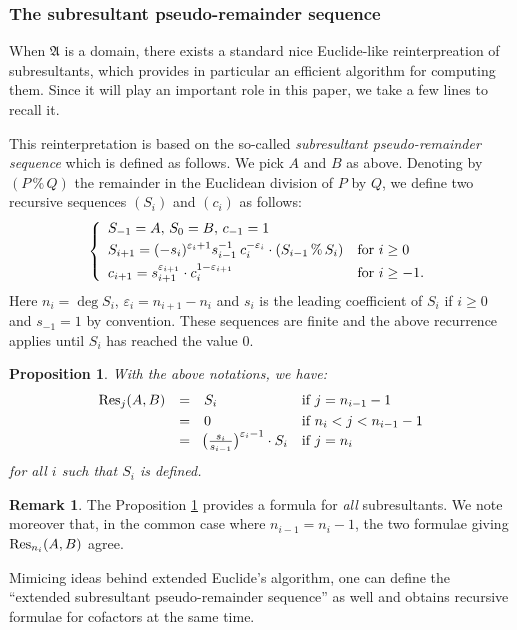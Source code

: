 \documentclass{jT}
\numberwithin{equation}{section}
\newtheorem{prop}[theo]{Proposition}
\theoremstyle{definition}
\newtheorem{rem}[theo]{Remark}
\newcommand{\ring}{\mathfrak A}
\renewcommand{\Res}{\text{\rm Res}}
\begin{document}
\subsubsection*{The subresultant pseudo-remainder sequence}

When $\ring$ is a domain, there exists a standard nice Euclide-like
reinterpreation of subresultants, which provides in particular an 
efficient algorithm for computing them. Since it will play an important 
role in this paper, we take a few lines to recall it.

This reinterpretation is based on the so-called \emph{subresultant 
pseudo-re\-mainder sequence} which is defined as follows. We pick $A$ and 
$B$ as above. Denoting by $(P \,\%\, Q)$ 
the remainder in the Euclidean division of $P$ by $Q$, we define two 
recursive sequences $(S_i)$ and $(c_i)$ as follows:
\begin{equation}
\label{eq:subressequence}
\left\{\begin{array}{ll}
S_{-1} = A, \, S_0 = B, \, c_{-1} = 1 \smallskip \\
\displaystyle S_{i+1} = (-s_i)^{\varepsilon_i + 1}
s_{i-1}^{-1} \: c_i^{-\varepsilon_i} \cdot (S_{i-1} \,\%\, S_i)
& \text{for } i \geq 0 \smallskip \\
\displaystyle c_{i+1} = s_{i+1}^{\varepsilon_{i+1}} \cdot c_i^{1-\varepsilon_{i+1}}
& \text{for } i \geq -1. 
\end{array}\right.
\end{equation}
Here $n_i = \deg S_i$, $\varepsilon_i = n_{i+1} - n_i$ and $s_i$ is the 
leading coefficient of $S_i$ if $i \geq 0$ and $s_{-1} = 1$ by 
convention. These sequences are finite and the above recurrence applies 
until $S_i$ has reached the value $0$.

\begin{prop}
\label{prop:prem}
With the above notations, we have:
$$\begin{array}{rcll}
\Res_j(A,B) & = & S_i & \text{if } j = n_{i-1} - 1 \smallskip \\
& = & 0 & \text{if } n_i < j < n_{i-1} - 1 \\
& = & \!\big(\frac{s_i}{s_{i-1}}\big)^{\varepsilon_i-1} \cdot S_i & 
\text{if } j = n_i
\end{array}$$
for all $i$ such that $S_i$ is defined.
\end{prop}

\begin{rem}
The Proposition \ref{prop:prem} provides a formula for \emph{all} 
subresultants. We note moreover that, in the common case where $n_{i-1} 
= n_i - 1$, the two formulae giving $\Res_{n_i}(A,B)$ agree.

Mimicing ideas behind extended Euclide's algorithm, one can define the 
``extended subresultant pseudo-remainder sequence'' as well and obtains
recursive formulae for cofactors at the same time.
\end{rem}
\end{document}
